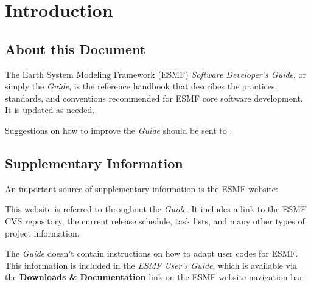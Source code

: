 
\section{Introduction}
\label{sec:intro}

\subsection{About this Document}
The Earth System Modeling Framework (ESMF) {\it Software Developer's Guide},
or simply the {\it Guide}, is the reference handbook that describes
the practices, standards, and conventions recommended for ESMF core software
development.  It is updated as needed.

Suggestions on how to improve the {\it Guide} should be sent to 
.

\subsection{Supplementary Information}
An important source of supplementary information is the ESMF website:
\begin{center}
\end{center}
This website is referred to throughout the {\it Guide}.  
It includes a link to the ESMF CVS repository, the current release
schedule, task lists, and many other types of project information.

The {\it Guide} doesn't contain instructions on how to adapt user
codes for ESMF.  This information is included in the {\it ESMF User's
Guide}\cite{bib:ESMFusrdoc}, which is available via the
{\bf Downloads \& Documentation} link on the ESMF website navigation bar.

